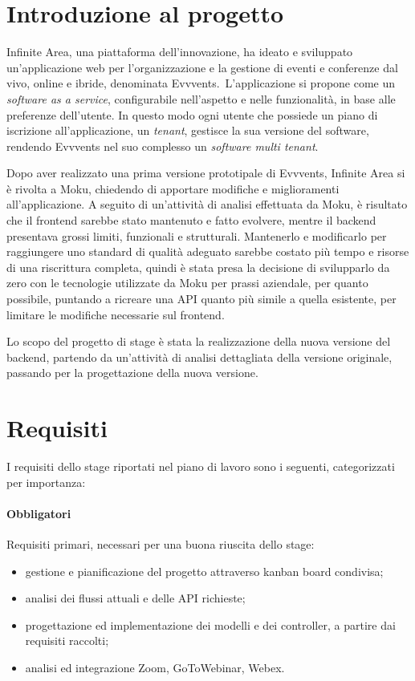 \section{Introduzione al progetto}
Infinite Area, una piattaforma dell'innovazione, ha ideato e sviluppato un'applicazione web per l'organizzazione e la gestione di eventi e conferenze dal vivo, online e ibride, denominata Evvvents.\ L'applicazione si propone come un \emph{software as a service}, configurabile nell'aspetto e nelle funzionalità, in base alle preferenze dell'utente. In questo modo ogni utente che possiede un piano di iscrizione all'applicazione, un \emph{tenant}, gestisce la sua versione del software, rendendo Evvvents nel suo complesso un \emph{software multi tenant}.

Dopo aver realizzato una prima versione prototipale di Evvvents, Infinite Area si è rivolta a Moku, chiedendo di apportare modifiche e miglioramenti all'applicazione. A seguito di un'attività di analisi effettuata da Moku, è risultato che il frontend sarebbe stato mantenuto e fatto evolvere, mentre il backend presentava grossi limiti, funzionali e strutturali. Mantenerlo e modificarlo per raggiungere uno standard di qualità adeguato sarebbe costato più tempo e risorse di una riscrittura completa, quindi è stata presa la decisione di svilupparlo da zero con le tecnologie utilizzate da Moku per prassi aziendale, per quanto possibile, puntando a ricreare una API quanto più simile a quella esistente, per limitare le modifiche necessarie sul frontend.

Lo scopo del progetto di stage è stata la realizzazione della nuova versione del backend, partendo da un'attività di analisi dettagliata della versione originale, passando per la progettazione della nuova versione.


\section{Requisiti}
I requisiti dello stage riportati nel piano di lavoro sono i seguenti, categorizzati per importanza:

\paragraph{Obbligatori} Requisiti primari, necessari per una buona riuscita dello stage:
\begin{itemize}
	\item gestione e pianificazione del progetto attraverso kanban board condivisa;
	\item analisi dei flussi attuali e delle API richieste;
	\item progettazione ed implementazione dei modelli e dei controller, a partire dai requisiti raccolti;
	\item analisi ed integrazione Zoom, GoToWebinar, Webex.
\end{itemize}

